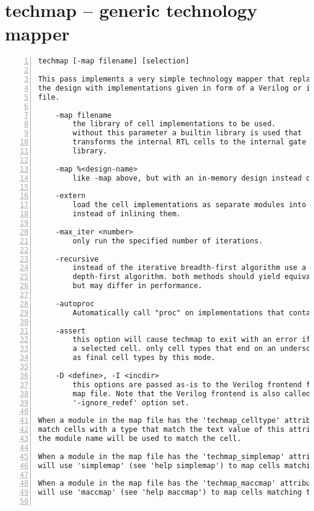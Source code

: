 \section{techmap -- generic technology mapper}
\label{cmd:techmap}
\begin{lstlisting}[numbers=left,frame=single]
    techmap [-map filename] [selection]

This pass implements a very simple technology mapper that replaces cells in
the design with implementations given in form of a Verilog or ilang source
file.

    -map filename
        the library of cell implementations to be used.
        without this parameter a builtin library is used that
        transforms the internal RTL cells to the internal gate
        library.

    -map %<design-name>
        like -map above, but with an in-memory design instead of a file.

    -extern
        load the cell implementations as separate modules into the design
        instead of inlining them.

    -max_iter <number>
        only run the specified number of iterations.

    -recursive
        instead of the iterative breadth-first algorithm use a recursive
        depth-first algorithm. both methods should yield equivalent results,
        but may differ in performance.

    -autoproc
        Automatically call "proc" on implementations that contain processes.

    -assert
        this option will cause techmap to exit with an error if it can't map
        a selected cell. only cell types that end on an underscore are accepted
        as final cell types by this mode.

    -D <define>, -I <incdir>
        this options are passed as-is to the Verilog frontend for loading the
        map file. Note that the Verilog frontend is also called with the
        '-ignore_redef' option set.

When a module in the map file has the 'techmap_celltype' attribute set, it will
match cells with a type that match the text value of this attribute. Otherwise
the module name will be used to match the cell.

When a module in the map file has the 'techmap_simplemap' attribute set, techmap
will use 'simplemap' (see 'help simplemap') to map cells matching the module.

When a module in the map file has the 'techmap_maccmap' attribute set, techmap
will use 'maccmap' (see 'help maccmap') to map cells matching the module.


\end{lstlisting}
